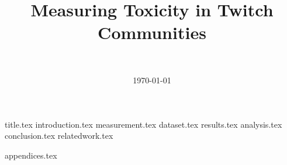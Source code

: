 \documentclass[final]{report}
\title{Measuring Toxicity in Twitch Communities}
\author{~}
\date{\today}
\begin{document}

{title.tex}
\newpage
{}\label{ch:contents}
\tableofcontents
\newpage
{}
{introduction.tex}
{measurement.tex}
{dataset.tex}
{results.tex}
{analysis.tex}
{conclusion.tex}
{relatedwork.tex}
\newpage
{}

\printbibliography
{appendices.tex}
\end{document}
